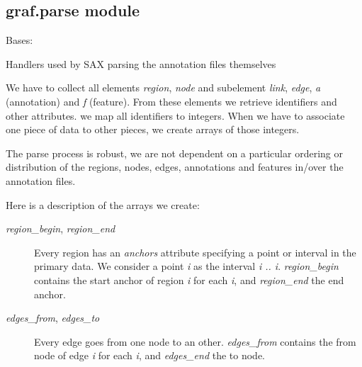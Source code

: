 \documentclass[letterpaper,10pt,english]{sphinxmanual}
\begin{document}

\begin{fulllineitems}
\label{graf/graf:graf.model.model}
\end{fulllineitems}



\subsection{graf.parse module}
\label{graf/graf:graf-parse-module}\label{graf/graf:module-graf.parse}

\begin{fulllineitems}
\label{graf/graf:graf.parse.AnnotationHandler}
Bases: \href{http://docs.python.org/library/xml.sax.handler.html\#xml.sax.handler.ContentHandler}{}

Handlers used by SAX parsing the annotation files themselves

We have to collect all elements \emph{region}, \emph{node} and subelement \emph{link}, \emph{edge}, \emph{a} (annotation) and \emph{f} (feature).
From these elements we retrieve identifiers and other attributes. we map all identifiers to integers. When we have to associate one piece of data to other pieces, we create arrays of those integers.

The parse process is robust, we are not dependent on a particular ordering or distribution of the regions, nodes, edges, annotations and features in/over the annotation files.

Here is a description of the arrays we create:
\begin{description}
\item[{\emph{region\_begin}, \emph{region\_end}}] \leavevmode
Every region has an \emph{anchors} attribute specifying a point or interval in the primary data. We consider a point \emph{i} as the interval \emph{i .. i}.
\emph{region\_begin} contains the start anchor of region \emph{i} for each \emph{i}, and \emph{region\_end} the end anchor.

\item[{\emph{edges\_from}, \emph{edges\_to}}] \leavevmode
Every edge goes from one node to an other. \emph{edges\_from} contains the from node of edge \emph{i} for each \emph{i}, and \emph{edges\_end} the to node.


\end{description}
\end{fulllineitems}
\end{document}

